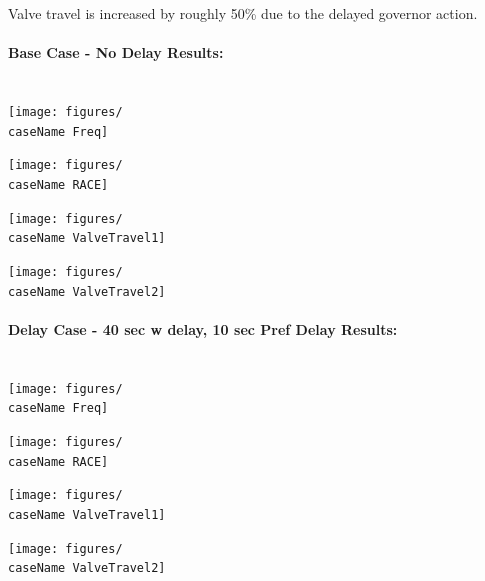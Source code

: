 \documentclass[12pt]{article}
\begin{document}
Valve travel is increased by roughly 50\% due to the delayed governor action.
\pagebreak

\newcommand{\caseName}{SixMachineDelayStep1}
\paragraph{Base Case - No Delay Results:} \ \\

\texttt{[image: figures/\\caseName Freq]}

\texttt{[image: figures/\\caseName RACE]}

\texttt{[image: figures/\\caseName ValveTravel1]}

\texttt{[image: figures/\\caseName ValveTravel2]}

\pagebreak
\renewcommand{\caseName}{SixMachineDelayStep3}
\paragraph{Delay Case - 40 sec w delay, 10 sec Pref Delay Results: } \ \\

\texttt{[image: figures/\\caseName Freq]}

\texttt{[image: figures/\\caseName RACE]}

\texttt{[image: figures/\\caseName ValveTravel1]}

\texttt{[image: figures/\\caseName ValveTravel2]}


		
\end{document}
